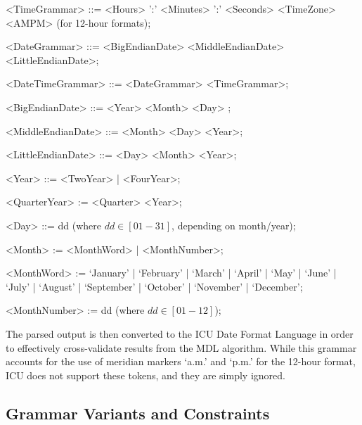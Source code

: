 \begin{grammar}
<TimeGrammar> ::= <Hours> ':' <Minutes> ':' <Seconds> <TimeZone> <AMPM> (for 12-hour formats);

<DateGrammar> ::= <BigEndianDate> 
				\alt <MiddleEndianDate> 
				\alt <LittleEndianDate>;

<DateTimeGrammar>  ::= <DateGrammar> 
					\alt <TimeGrammar>;
					

<BigEndianDate> ::= <Year> <Month>  <Day> ;

<MiddleEndianDate> ::= <Month> <Day> <Year>;

<LittleEndianDate> ::= <Day> <Month> <Year>;

<Year> ::= <TwoYear> | <FourYear>;

<QuarterYear> := <Quarter> <Year>;

<Day>     ::= dd (where $dd \in [01-31]$, depending on month/year);

<Month> := <MonthWord> | <MonthNumber>;

<MonthWord> := `January' | `February' | `March' | `April' | `May' | `June' | `July' | `August' | `September' | `October' | `November' | `December';

<MonthNumber> := dd (where $dd \in [01-12]$);










\end{grammar}


The parsed output is then converted to the ICU Date Format Language in order to effectively cross-validate results from the MDL algorithm. While this grammar accounts for the use of meridian markers `a.m.' and `p.m.' for the 12-hour format, ICU does not support these tokens, and they are simply ignored.

\subsection{Grammar Variants and Constraints}

